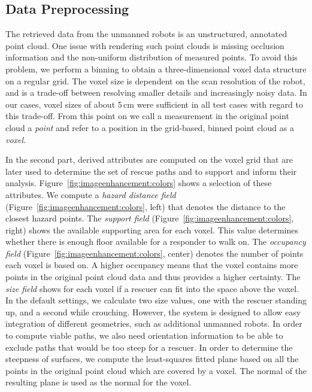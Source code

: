 \documentclass{egpubl}
\begin{document}
\subsection{Data Preprocessing} \label{sec:overview:preprocessing}
The retrieved data from the unmanned robots is an unstructured, annotated point cloud. One issue with rendering such point clouds is missing occlusion information and the non-uniform distribution of measured points. To avoid this problem, we perform a binning to obtain a three-dimensional voxel data structure on a regular grid. The voxel size is dependent on the scan resolution of the robot, and is a trade-off between resolving smaller details and increasingly noisy data. In our cases, voxel sizes of about 5\,cm were sufficient in all test cases with regard to this trade-off. From this point on we call a measurement in the original point cloud a \emph{point} and refer to a position in the grid-based, binned point cloud as a \emph{voxel}.

 In the second part, derived attributes are computed on the voxel grid that are later used to determine the set of rescue paths and to support and inform their analysis. Figure~\ref{fig:imageenhancement:colors} shows a selection of these attributes. We compute a \emph{hazard distance field} (Figure~\ref{fig:imageenhancement:colors}, left) that denotes the distance to the closest hazard points. The \emph{support field} (Figure~\ref{fig:imageenhancement:colors}, right) shows the available supporting area for each voxel. This value determines whether there is enough floor available for a responder to walk on. The \emph{occupancy field} (Figure~\ref{fig:imageenhancement:colors}, center) denotes the number of points each voxel is based on. A higher occupancy means that the voxel contains more points in the original point cloud data and thus provides a higher certainty. The \emph{size field} shows for each voxel if a rescuer can fit into the space above the voxel. In the default settings, we calculate two size values, one with the rescuer standing up, and a second while crouching. However, the system is designed to allow easy integration of different geometries, such as additional unmanned robots. In order to compute viable paths, we also need orientation information to be able to exclude paths that would be too steep for a rescuer. In order to determine the steepness of surfaces, we compute the least-squares fitted plane based on all the points in the original point cloud which are covered by a voxel. The normal of the resulting plane is used as the normal for the voxel.
\end{document}
